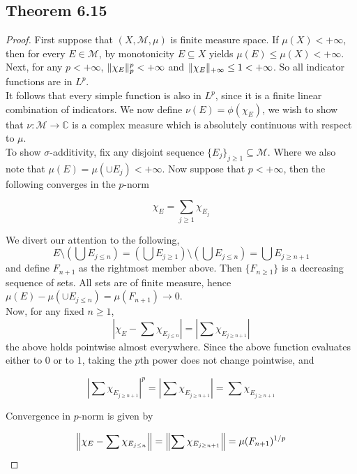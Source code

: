 \documentclass[../../main.tex]{subfiles}
\begin{document}
\subsection{Theorem 6.15}
\begin{wts}
    
\end{wts}
\begin{proof}
First suppose that $(X,\mathcal{M}, \mu)$ is finite measure space. If $\mu(X)<+\infty$, then for every $E\in\mathcal{M}$, by monotonicity $E\subseteq X$ yields $\mu(E)\leq \mu(X)<+\infty$. Next, for any $p<+\infty$, $\lVert {\chi_E} \rVert ^p_p<+\infty$ and $\lVert {\chi_E} \rVert_{+\infty}\leq 1<+\infty$. So all indicator functions are in $L^p$.\\

It follows that every simple function is also in $L^p$, since it is a finite linear combination of indicators. We now define $\nu(E) = \phi(\chi_E)$, we wish to show that $\nu:\mathcal{M}\longrightarrow \mathbb{C}$ is a complex measure which is absolutely continuous with respect to $\mu$.\\

To show $\sigma$-additivity, fix any disjoint sequence $\{E_j\}_{j\geq 1}\subseteq \mathcal{M}$. Where we also note that $\mu(E) = \mu(\cup E_j) <+\infty$. Now suppose that $p<+\infty$, then the following converges in the $p$-norm

\[
\chi_E = \sum_{j\geq 1}\chi_{E_j}
\]

We divert our attention to the following,
\[
E\setminus\left(\bigcup E_{j\leq n}\right) = \left(\bigcup E_{j\geq 1}\right)\setminus \left(\bigcup E_{j\leq n}\right) = \bigcup E_{j\geq n+1}
\]
and define $F_{n+1}$ as the rightmost member above. Then $\{F_{n\geq 1}\}$ is a decreasing sequence of sets. All sets are of finite measure, hence $\mu(E) - \mu(\cup E_{j\leq n}) = \mu(F_{n+1})\to 0$.\\ 

Now, for any fixed $n\geq 1$, 
\[
\left|\chi_E - \sum \chi_{E_{j\leq n}}\right| = \left|\sum \chi_{E_{j\geq n+1}}\right| 
\]
the above holds pointwise almost everywhere. Since the above function evaluates either to $0$ or to $1$, taking the $p$th power does not change pointwise, and 

\[
\left|\sum \chi_{E_{j\geq n+1}}\right|^p = \left|\sum \chi_{E_{j\geq n+1}}\right| = \sum \chi_{E_{j\geq n+1}}
\]

Convergence in $p$-norm is given by

\[
\left\lVert {\chi_E - \sum \chi_{E_{j\leq n}}} \right\rVert = \left\lVert {\sum \chi_{E_{j\geq n+1}}} \right\rVert = \mu(F_{n+1})^{1/p}
\]


\end{proof}
\end{document}
